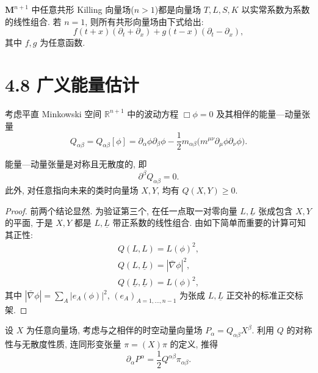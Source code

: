 \begin{theorem}\label{thm:4.7}
$\mathbf{M}^{n+1}$ 中任意共形 Killing 向量场($n>1$)都是向量场 $T,L,S,K$ 以实常系数为系数的线性组合. 若 $n=1$, 则所有共形向量场由下式给出:
\begin{equation}
f(t+x)(\partial_t+\partial_x)+g(t-x)(\partial_t-\partial_x),\end{equation}
其中 $f,g$ 为任意函数.\end{theorem}

\setcounter{mtthm}{8}%

\section*{4.8 广义能量估计}

考虑平直 Minkowski 空间 $\mathbb{R}^{n+1}$ 中的波动方程 $\Box\phi=0$ 及其相伴的能量---动量张量
\begin{equation}
Q_{\alpha\beta}=Q_{\alpha\beta}[\phi]=\partial_\alpha\phi\partial_\beta\phi-\frac12 m_{\alpha\beta}\bigl(m^{\mu\nu}\partial_\mu\phi\partial_\nu\phi\bigr).\end{equation}

\begin{proposition}\label{prop:4.9}
能量---动量张量是对称且无散度的, 即
\begin{equation}
\partial^\beta Q_{\alpha\beta}=0.\end{equation}
此外, 对任意指向未来的类时向量场 $X,Y$, 均有 $Q(X,Y)\geq 0$.\end{proposition}

\begin{proof}
前两个结论显然. 为验证第三个, 在任一点取一对零向量 $L,\underline{L}$ 张成包含 $X,Y$ 的平面, 于是 $X,Y$ 都是 $L,\underline{L}$ 带正系数的线性组合. 由如下简单而重要的计算可知其正性:
\begin{gather}
Q(L,L)=L(\phi)^2,\\
Q(L,\underline{L})=|\bar\nabla\phi|^2,\\
Q(\underline{L},\underline{L})=L(\phi)^2,\end{gather}
其中 $|\bar\nabla\phi|=\sum_A |e_A(\phi)|^2$, $(e_A)_{A=1,\ldots,n-1}$ 为张成 $L,\underline{L}$ 正交补的标准正交标架.\end{proof}

设 $X$ 为任意向量场, 考虑与之相伴的时空动量向量场 $P_\alpha=Q_{\alpha\beta}X^\beta$. 利用 $Q$ 的对称性与无散度性质, 连同形变张量 $\pi=(X)\pi$ 的定义, 推得
\begin{equation}
\partial_\alpha P^\alpha=\frac12 Q^{\alpha\beta}\pi_{\alpha\beta}.\end{equation}

